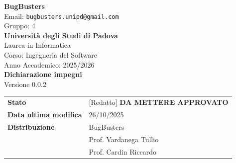 \documentclass[a4paper,11pt]{article}
\newcommand{\CurrentVersion}{0.0.2}
\begin{document}
\begin{center}  
  
  {\Large\bfseries\color{primaryblue} BugBusters}\\[0.3cm]
  {\small\color{darkgray} Email: \texttt{bugbusters.unipd@gmail.com}} \\[0.1cm]
  {\small\color{darkgray} Gruppo: 4} \\[0.5cm]

  {\large\bfseries Università degli Studi di Padova}\\[0.3cm]
  {\small Laurea in Informatica}\\[0.2cm]
  {\small Corso: Ingegneria del Software}\\[0.2cm]
  {\small Anno Accademico: 2025/2026}\\[0.8cm]

  {\Huge\bfseries\color{primaryblue} Dichiarazione impegni}\\[0.3cm]
  {\Large Versione \CurrentVersion}\\[0.8cm]
\end{center}

\begin{center}
\begin{tcolorbox}[colback=lightgray,colframe=primaryblue,width=0.85\textwidth,arc=3mm,boxrule=0.5pt]
\begin{tabular}{@{}ll@{}}
\textbf{Stato} & [Redatto] \textbf{DA METTERE APPROVATO} \\
\textbf{Data ultima modifica} & 26/10/2025 \\
\textbf{Distribuzione} & BugBusters \\
 & Prof. Vardanega Tullio \\
 & Prof. Cardin Riccardo \\
\end{tabular}
\end{tcolorbox}
\end{center}
\end{document}
